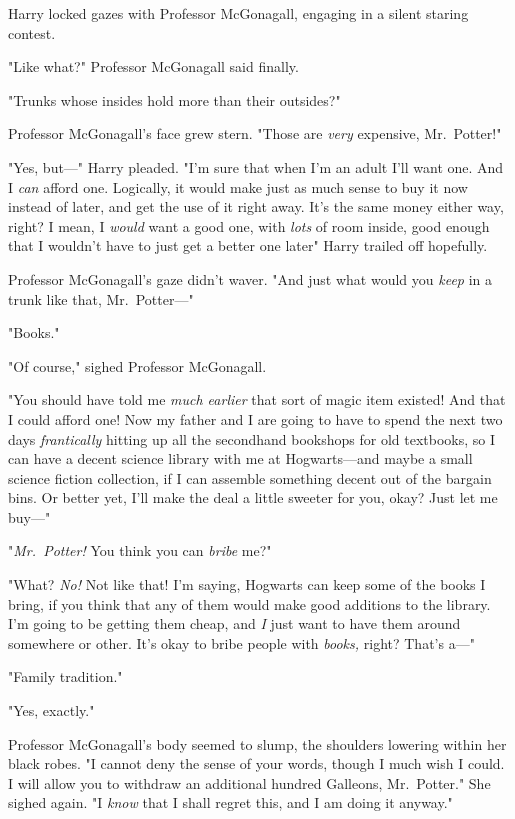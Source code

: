 Harry locked gazes with Professor McGonagall, engaging in a silent staring
contest.

"Like what?" Professor McGonagall said finally.

"Trunks whose insides hold more than their outsides?"

Professor McGonagall's face grew stern. "Those are \emph{very} expensive,
Mr.~Potter!"

"Yes, but---" Harry pleaded. "I'm sure that when I'm an adult I'll want one.
And I \emph{can} afford one. Logically, it would make just as much sense to buy
it now instead of later, and get the use of it right away. It's the same money
either way, right? I mean, I \emph{would} want a good one, with \emph{lots} of
room inside, good enough that I wouldn't have to just get a better one
later{\el}" Harry trailed off hopefully.

Professor McGonagall's gaze didn't waver. "And just what would you \emph{keep}
in a trunk like that, Mr.~Potter---"

"Books."

"Of course," sighed Professor McGonagall.

"You should have told me \emph{much earlier} that sort of magic item existed!
And that I could afford one! Now my father and I are going to have to spend the
next two days \emph{frantically} hitting up all the secondhand bookshops for
old textbooks, so I can have a decent science library with me at Hogwarts---and
maybe a small science fiction collection, if I can assemble something decent
out of the bargain bins. Or better yet, I'll make the deal a little sweeter for
you, okay? Just let me buy---"

"\emph{Mr.~Potter!} You think you can \emph{bribe} me?"

"What? \emph{No!} Not like that! I'm saying, Hogwarts can keep some of the
books I bring, if you think that any of them would make good additions to the
library. I'm going to be getting them cheap, and \emph{I} just want to have
them around somewhere or other. It's okay to bribe people with \emph{books,}
right? That's a---"

"Family tradition."

"Yes, exactly."

Professor McGonagall's body seemed to slump, the shoulders lowering within her
black robes. "I cannot deny the sense of your words, though I much wish I
could. I will allow you to withdraw an additional hundred Galleons,
Mr.~Potter." She sighed again. "I \emph{know} that I shall regret this, and I
am doing it anyway."

